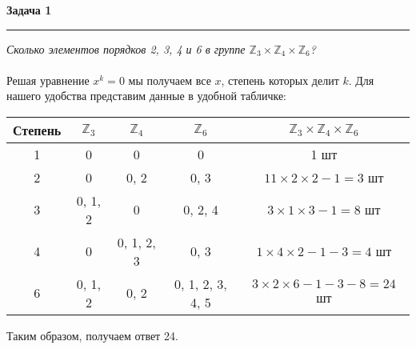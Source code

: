 \documentclass[a4paper,11pt]{article}
\begin{document}
\textbf{\large Задача 1}
\medskip\hrule\medskip
\textit{Сколько элементов порядков 2, 3, 4 и 6 в группе $ \mathbb{Z}_3 \times \mathbb{Z}_4 \times \mathbb{Z}_6 $?} \\ \\
Решая уравнение $ x^k = 0 $ мы получаем все $ x $, степень которых делит $ k $.  Для нашего удобства представим данные в удобной табличке:
\begin{center}
\begin{tabular}{|c|c|c|c|c|}
	\hline
	Степень & $ \mathbb{Z}_3 $ & $ \mathbb{Z}_4 $ & $ \mathbb{Z}_6 $ & $ \mathbb{Z}_3 \times \mathbb{Z}_4 \times \mathbb{Z}_6 $ \\
	\hline
	1 & 0 & 0 & 0 & 1 шт \\
	\hline
	2 & 0 & 0, 2 & 0, 3 & $ 1 1 \times 2 \times 2 - 1 = 3 $ шт \\
	\hline
	3 & 0, 1, 2 & 0 & 0, 2, 4 & $ 3 \times 1 \times 3 - 1 = 8 $ шт \\
	\hline
	4 & 0 & 0, 1, 2, 3 & 0, 3 & $ 1 \times 4 \times 2 - 1 - 3 = 4 $ шт \\
	\hline
	6 & 0, 1, 2 & 0, 2 & 0, 1, 2, 3, 4, 5& $ 3 \times 2 \times 6 - 1 - 3 - 8 = 24 $ шт \\
	\hline
\end{tabular}
\end{center}
Таким образом, получаем ответ 24. \\ \\ \\





\end{document}
